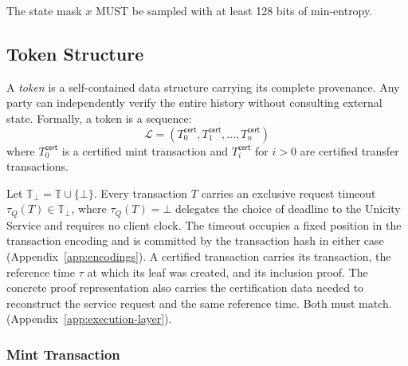 The state mask $x$ MUST be sampled with at least 128 bits of min-entropy.

\subsection{Token Structure}\label{sec:token-structure}

A \emph{token} is a self-contained data structure carrying its complete provenance. Any party can independently verify the entire history without consulting external state. Formally, a token is a sequence:
\[
\mathcal{L} = (T_0^\mathsf{cert}, T_1^\mathsf{cert}, \ldots, T_n^\mathsf{cert})
\]
where $T_0^\mathsf{cert}$ is a certified mint transaction and $T_i^\mathsf{cert}$ for $i > 0$ are certified transfer transactions.

Let $\mathbb{T}_\bot=\mathbb{T}\cup\{\bot\}$. Every transaction $T$ carries an exclusive request timeout $\tau_Q(T)\in\mathbb{T}_\bot$, where $\tau_Q(T)=\bot$ delegates the choice of deadline to the Unicity Service and requires no client clock. The timeout occupies a fixed position in the transaction encoding and is committed by the transaction hash in either case (Appendix~\ref{app:encodings}). A certified transaction carries its transaction, the reference time $\tau$ at which its leaf was created, and its inclusion proof. The concrete proof representation also carries the certification data needed to reconstruct the service request and the same reference time. Both must match. (Appendix~\ref{app:execution-layer}).

\subsubsection{Mint Transaction}\label{sec:mint-tx}


